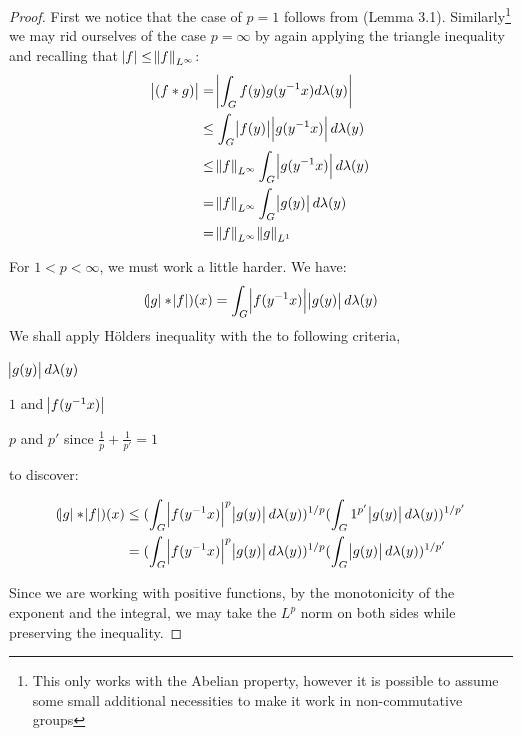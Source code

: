 \begin{proof}
First we notice that the case of $p=1$ follows from (Lemma 3.1). Similarly\footnote{This only works with the Abelian property, however it is possible to assume some small additional necessities to make it work in non-commutative groups} we may rid ourselves of the case $p=\infty$ by again applying the triangle inequality and recalling that $\abs{f} \leq \norm{f}_{L^\infty}$:
\begin{align*}
\abs{(f \ast g)} &= \abs{\int_G f(y)g(y^{-1}x) d\lambda(y)} \\
&\leq \int_G \abs{f(y)} \abs{g(y^{-1}x)} d\lambda(y) \\
&\leq \norm{f}_{L^\infty} \int_G \abs{g(y^{-1}x)} d\lambda(y) \\
&= \norm{f}_{L^\infty} \int_G \abs{g(y)} d\lambda(y) \\
&= \norm{f}_{L^\infty} \norm{g}_{L^1}
\end{align*}

For $ 1 < p < \infty$, we must work a little harder. We have:
\begin{equation*}
(\abs{g} \ast \abs{f} )(x) = \int_G \abs{f(y^{-1}x)}\abs{g(y)} d\lambda(y)
\end{equation*}
We shall apply H\"olders inequality with the to following criteria,

\begin{description}
[align=right,labelwidth=3cm]
\item [Measure] $\abs{g(y)} d\lambda(y)$
\item [Functions] $1$ and $\abs{f(y^{-1}x)}$
\item [Exponents] $p$ and $p'$ since $\frac{1}{p}+\frac{1}{p'} = 1$
\end{description}

to discover:

\begin{align*}
(\abs{g} \ast \abs{f} )(x) &\leq (\int_G \abs{f(y^{-1}x)}^p \abs{g(y)} d\lambda(y))^{1/p} (\int_G 1^{p'} \abs{g(y)} 
 d\lambda(y))^{1/p'} \\
 &= (\int_G \abs{f(y^{-1}x)}^p \abs{g(y)} d\lambda(y))^{1/p} (\int_G \abs{g(y)} 
 d\lambda(y))^{1/p'}
\end{align*}

Since we are working with positive functions, by the monotonicity of the exponent and the integral, we may take the $L^p$ norm on both sides while preserving the inequality.


\end{proof}
